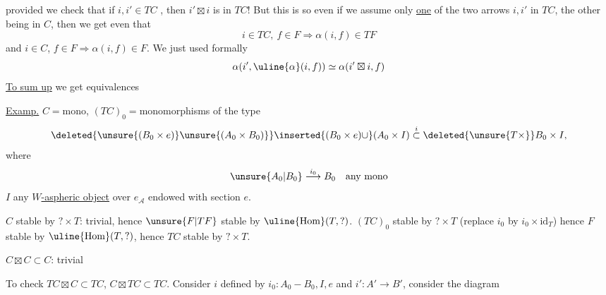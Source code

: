 provided we check that if $i,i'\in TC$ , then $i'\boxtimes i$ is in $TC$! 
But  this is so even if we assume only \uline{one} of the two arrows $i,i'$ in $TC$, the other being in $C$, then we get even that
\[
i\in TC,\ f\in F\Longrightarrow\alpha(i,f)\in TF
\]
and $i\in C$, $f\in F\Rightarrow\alpha(i,f)\in F$.
We just used formally
\[
\alpha(i',\uline{\alpha}(i,f))\simeq\alpha(i'\boxtimes i,f)
\]
\uline{To sum up} we get equivalences

\uline{Examp.} 
 $C={}$mono, $(TC)_0={}$monomorphisms of the type
\[
\deleted{\unsure{(B_0\times e)}\unsure{(A_0\times B_0)}}\inserted{(B_0\times e)\cup}(A_0\times I)\overset{i}{\subset}\deleted{\unsure{T\times}}B_0\times I,
\]
where
\[
\unsure{A_0|B_0}\overset{i_0}{\longrightarrow}B_0\quad\text{any mono}
\]
$I$ any \uline{$W$-aspheric object} over $e_{\mathcal A}$ endowed with section $e$.

$C$ stable by $?\times T$: trivial, hence $\unsure{F|TF}$ stable by $\uline{\mathrm{Hom}}(T,?)$.
$(TC)_0$ stable by $?\times T$ (replace $i_0$ by $i_0\times\mathrm{id}_T$) hence $F$ stable by $\uline{\mathrm{Hom}}(T,?)$, hence $TC$ stable by $?\times T$.

$C\boxtimes C\subset C$: trivial

To check $TC\boxtimes C\subset TC$, $C\boxtimes TC\subset TC$. Consider $i$ defined by $i_0\colon A_0-B_0,I,e$  and $i'\colon A'\to B'$, consider the diagram

